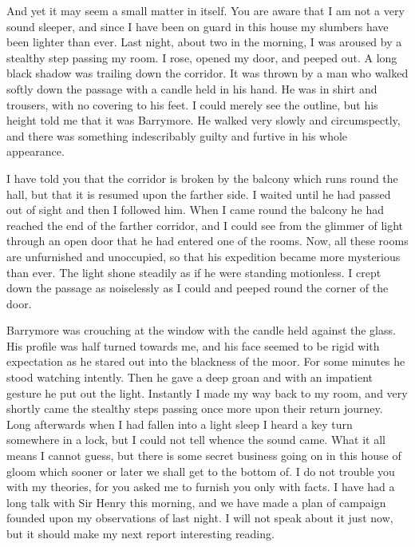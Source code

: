 \documentclass[paper=a5,BCOR=7mm,twoside,DIV=calc,12pt,usegeometry,openany,chapterprefix,endperiod,headings=big]{scrbook} %
\begin{document}
And yet it may seem a small matter in itself. You are aware that I am not a very \newline sound sleeper, and since I have been on guard in this house my slumbers have been light\-er than ever. Last night, about two in the morning, I was aroused by a stealthy step pass\-ing my room. I rose, opened my door, and peeped out. A long black sha\-dow was trailing down the corridor. It was thrown by a man who walked softly down the passage with a candle held in his hand. He was in shirt and trousers, with no covering to his feet. I could merely see the outline, but his height told me that it was Barrymore. He walked very slowly and circumspectly, and there was something indescribably guilty and furtive in his whole appearance.

I have told you that the corridor is broken by the balcony which runs round the hall, but that it is resumed upon the farther side. I waited until he had passed out of sight and then I followed him. When I came round the balcony he had reached the end of the farther corridor, and I could see from the glimmer of light through an open door that he had entered one of the rooms. Now, all these rooms are unfurnished and unoccupied, so that his expedition became more mysterious than ever. The light shone steadily as if he were standing motionless. I crept down the passage as noiselessly as I could and peeped round the corner of the door.





Barrymore was crouching at the window with the candle held against the glass. His profile was half turned towards me, and his face seemed to be rigid with expectation as he stared out into the blackness of the moor. For some minutes he stood watching intently. Then he gave a deep groan and with an impatient gesture he put out the light. Instantly I made my way back to my room, and very shortly came the stealthy steps passing once more upon their return journey. Long afterwards when I had fallen into a light sleep I heard a key turn somewhere in a lock, but I could not tell whence the sound came. What it all means I cannot guess, but there is some secret business going on in this house of gloom which sooner or later we shall get to the bottom of. I do not trouble you with my theories, for you asked me to furnish you only with facts. I have had a long talk with Sir Henry this morning, and we have made a plan of campaign founded upon my observations of last night. I will not speak about it just now, but it should make my next report interesting reading.
\end{document}
